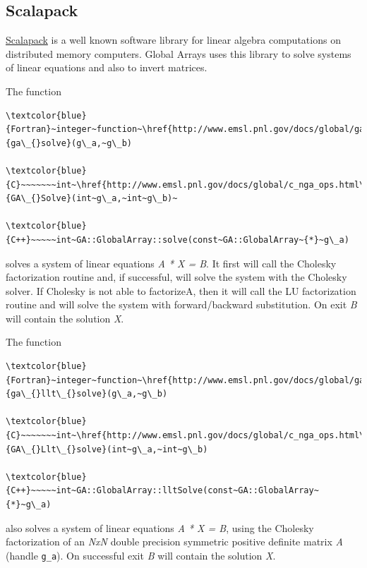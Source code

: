 \subsection{Scalapack }

\href{http://www.netlib.org/scalapack/index.html}{Scalapack} is a
well known software library for linear algebra computations on distributed
memory computers. Global Arrays uses this library to solve systems
of linear equations and also to invert matrices.

The function
\begin{verbatim}
\textcolor{blue}{Fortran}~integer~function~\href{http://www.emsl.pnl.gov/docs/global/ga_ops.html\#ga_solve}{ga\_{}solve}(g\_a,~g\_b)

\textcolor{blue}{C}~~~~~~~int~\href{http://www.emsl.pnl.gov/docs/global/c_nga_ops.html\#ga_solve}{GA\_{}Solve}(int~g\_a,~int~g\_b)~

\textcolor{blue}{C++}~~~~~int~GA::GlobalArray::solve(const~GA::GlobalArray~{*}~g\_a)
\end{verbatim}
solves a system of linear equations \emph{A {*} X = B}. It first will
call the Cholesky factorization routine and, if successful, will solve
the system with the Cholesky solver. If Cholesky is not able to factorizeA,
then it will call the LU factorization routine and will solve the
system with forward/backward substitution. On exit \emph{B} will contain
the solution \emph{X}.

The function
\begin{verbatim}
\textcolor{blue}{Fortran}~integer~function~\href{http://www.emsl.pnl.gov/docs/global/ga_ops.html\#ga_llt_solve}{ga\_{}llt\_{}solve}(g\_a,~g\_b)

\textcolor{blue}{C}~~~~~~~int~\href{http://www.emsl.pnl.gov/docs/global/c_nga_ops.html\#ga_llt_solve}{GA\_{}Llt\_{}solve}(int~g\_a,~int~g\_b)

\textcolor{blue}{C++}~~~~~int~GA::GlobalArray::lltSolve(const~GA::GlobalArray~{*}~g\_a)
\end{verbatim}
also solves a system of linear equations \emph{A {*} X = B}, using
the Cholesky factorization of an \emph{NxN} double precision symmetric
positive definite matrix \emph{A} (handle \texttt{g\_a}). On successful
exit \emph{B} will contain the solution \emph{X}.

